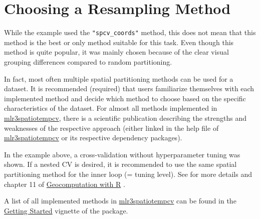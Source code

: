 \documentclass[
]{jss}
\begin{document}
\hypertarget{choosing-a-resampling-method}{%
\section{Choosing a Resampling
Method}\label{choosing-a-resampling-method}}

While the example used the \texttt{"spcv\_coords"} method, this does not
mean that this method is the best or only method suitable for this task.
Even though this method is quite popular, it was mainly chosen because
of the clear visual grouping differences compared to random
partitioning.

In fact, most often multiple spatial partitioning methods can be used
for a dataset. It is recommended (required) that users familiarize
themselves with each implemented method and decide which method to
choose based on the specific characteristics of the dataset. For almost
all methods implemented in
\href{https://mlr3spatiotempcv.mlr-org.com}{mlr3spatiotempcv}, there is
a scientific publication describing the strengths and weaknesses of the
respective approach (either linked in the help file of
\href{https://mlr3spatiotempcv.mlr-org.com}{mlr3spatiotempcv} or its
respective dependency packages).

In the example above, a cross-validation without hyperparameter tuning
was shown. If a nested CV is desired, it is recommended to use the same
spatial partitioning method for the inner loop (= tuning level). See
\citet{schratz2019} for more details and chapter 11 of
\href{https://geocompr.robinlovelace.net/spatial-cv.html}{Geocomputation
with R} \citep{lovelace2019}.

A list of all implemented methods in
\href{https://mlr3spatiotempcv.mlr-org.com}{mlr3spatiotempcv} can be
found in the
\href{https://mlr3spatiotempcv.mlr-org.com/articles/mlr3spatiotempcv.html}{Getting
Started} vignette of the package.

\renewcommand\refname{References}

\end{document}
